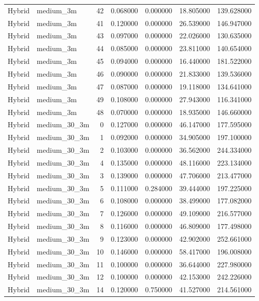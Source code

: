 \begin{tabular}{llrrrrr}
Hybrid & medium_3m & 42 & 0.068000 & 0.000000 & 18.805000 & 139.628000 \\
Hybrid & medium_3m & 41 & 0.120000 & 0.000000 & 26.539000 & 146.947000 \\
Hybrid & medium_3m & 43 & 0.097000 & 0.000000 & 22.026000 & 130.635000 \\
Hybrid & medium_3m & 44 & 0.085000 & 0.000000 & 23.811000 & 140.654000 \\
Hybrid & medium_3m & 45 & 0.094000 & 0.000000 & 16.440000 & 181.522000 \\
Hybrid & medium_3m & 46 & 0.090000 & 0.000000 & 21.833000 & 139.536000 \\
Hybrid & medium_3m & 47 & 0.087000 & 0.000000 & 19.118000 & 134.641000 \\
Hybrid & medium_3m & 49 & 0.108000 & 0.000000 & 27.943000 & 116.341000 \\
Hybrid & medium_3m & 48 & 0.070000 & 0.000000 & 18.935000 & 146.660000 \\
Hybrid & medium_30_3m & 0 & 0.127000 & 0.000000 & 46.147000 & 177.595000 \\
Hybrid & medium_30_3m & 1 & 0.092000 & 0.000000 & 34.905000 & 197.100000 \\
Hybrid & medium_30_3m & 2 & 0.103000 & 0.000000 & 36.562000 & 244.334000 \\
Hybrid & medium_30_3m & 4 & 0.135000 & 0.000000 & 48.116000 & 223.134000 \\
Hybrid & medium_30_3m & 3 & 0.139000 & 0.000000 & 47.706000 & 213.477000 \\
Hybrid & medium_30_3m & 5 & 0.111000 & 0.284000 & 39.444000 & 197.225000 \\
Hybrid & medium_30_3m & 6 & 0.108000 & 0.000000 & 38.499000 & 177.082000 \\
Hybrid & medium_30_3m & 7 & 0.126000 & 0.000000 & 49.109000 & 216.577000 \\
Hybrid & medium_30_3m & 8 & 0.116000 & 0.000000 & 46.809000 & 177.498000 \\
Hybrid & medium_30_3m & 9 & 0.123000 & 0.000000 & 42.902000 & 252.661000 \\
Hybrid & medium_30_3m & 10 & 0.146000 & 0.000000 & 58.417000 & 196.008000 \\
Hybrid & medium_30_3m & 11 & 0.100000 & 0.000000 & 36.644000 & 227.980000 \\
Hybrid & medium_30_3m & 12 & 0.100000 & 0.000000 & 42.153000 & 242.226000 \\
Hybrid & medium_30_3m & 14 & 0.120000 & 0.750000 & 41.527000 & 214.561000 \\

\end{tabular}
